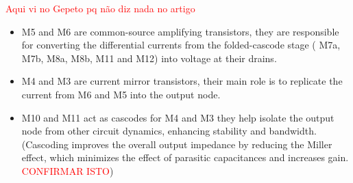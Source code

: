 \textcolor{red}{Aqui vi no Gepeto pq não diz nada no artigo}
\begin{itemize}    
    \item M5 and M6 are common-source amplifying transistors, they are responsible for converting the differential currents from the folded-cascode stage ( M7a, M7b, M8a, M8b, M11 and M12) into voltage at their drains.
    \item M4 and M3 are current mirror transistors, their main role is to replicate the current from M6 and M5 into the output node.
    \item M10 and M11 act as cascodes for M4 and M3 they help isolate the output node from other circuit dynamics, enhancing stability and bandwidth.\\
    
    (Cascoding improves the overall output impedance by reducing the Miller effect, which minimizes the effect of parasitic capacitances and increases gain. \textcolor{red}{CONFIRMAR ISTO})
 
\end{itemize}
\newpage